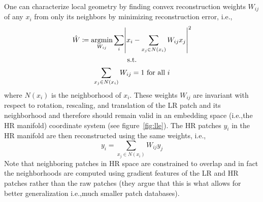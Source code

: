 One can characterize local geometry by finding convex reconstruction weights \(W_{ij}\) of any \(x_i\) from only its neighbors by minimizing reconstruction error, i.e.,\begin{gather}
                                                                                                                                                                            \hat{W} \coloneqq \underset{W_{ij}}{\text{argmin}} \sum_i \abs{ x_i - \sum_{x_j \in N(x_i)} W_{ij} x_j  }^2 \nonumber \\
                                                                                                                                                                            \text{s.t.} \\
                                                                                                                                                                            \sum_{x_j \in N(x_i)} W_{ij} = 1 \text{ for all }i \nonumber
\end{gather}
where \(N(x_i)\) is the neighborhood of \(x_i\).
%
These weights \(W_{ij}\) are invariant with respect to rotation, rescaling, and translation of the LR patch and its neighborhood\cite{saul2000introduction} and therefore should remain valid in an embedding space (i.e.,the HR manifold) coordinate system (see figure~\ref{fig:lle}).
%
The HR patches \(y_i\) in the HR manifold are then reconstructed using the same weights, i.e.,\begin{equation}
                                                                                                  y_i = \sum_{x_j \in N(x_i)} W_{ij} y_j
\end{equation}
%
Note that neighboring patches in HR space are constrained to overlap and in fact the neighborhoods are computed using gradient features of the LR and HR patches rather than the raw patches (they argue that this is what allows for better generalization i.e.,much smaller patch databases).
